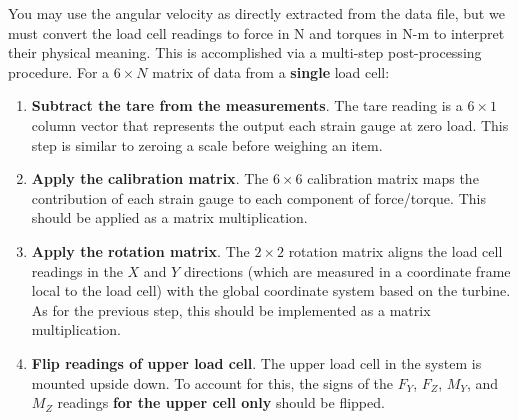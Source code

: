 \documentclass{homework}
\begin{document}
You may use the angular velocity as directly extracted from the data file, but we must convert the load cell readings to force in N and torques in N-m to interpret their physical meaning. This is accomplished via a multi-step post-processing procedure. For a $6\!\times\!N$ matrix of data from a \textbf{single} load cell:

\begin{minipage}{.4\linewidth}
    \begin{enumerate}
        \itemsep0em 
        \item \textbf{Subtract the tare from the measurements}. The tare reading is a $6\!\times\!1$ column vector that represents the output each strain gauge at zero load. This step is similar to zeroing a scale before weighing an item.
        \item \textbf{Apply the calibration matrix}. The $6\!\times\!6$ calibration matrix maps the contribution of each strain gauge to each component of force/torque. This should be applied as a matrix multiplication.
        \item \textbf{Apply the rotation matrix}. The $2\!\times\!2$ rotation matrix aligns the load cell readings in the $X$ and $Y$ directions (which are measured in a coordinate frame local to the load cell) with the global coordinate system based on the turbine. As for the previous step, this should be implemented as a matrix multiplication.
        \item \textbf{Flip readings of upper load cell}. The upper load cell in the system is mounted upside down. To account for this, the signs of the $F_Y$, $F_Z$, $M_Y$, and $M_Z$ readings \textbf{for the upper cell only} should be flipped.
    \end{enumerate}
\end{minipage}
\hfill
\end{document}
